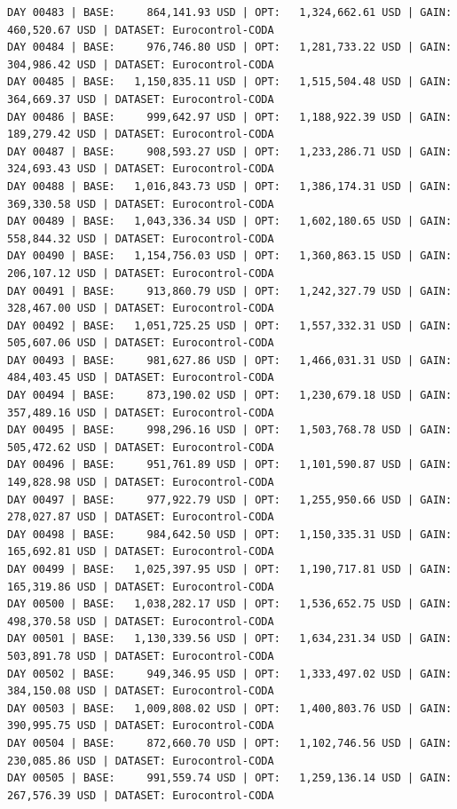 \documentclass[11pt,a4paper]{article}
\begin{document}
\begin{verbatim}
DAY 00483 | BASE:     864,141.93 USD | OPT:   1,324,662.61 USD | GAIN: 460,520.67 USD | DATASET: Eurocontrol-CODA
DAY 00484 | BASE:     976,746.80 USD | OPT:   1,281,733.22 USD | GAIN: 304,986.42 USD | DATASET: Eurocontrol-CODA
DAY 00485 | BASE:   1,150,835.11 USD | OPT:   1,515,504.48 USD | GAIN: 364,669.37 USD | DATASET: Eurocontrol-CODA
DAY 00486 | BASE:     999,642.97 USD | OPT:   1,188,922.39 USD | GAIN: 189,279.42 USD | DATASET: Eurocontrol-CODA
DAY 00487 | BASE:     908,593.27 USD | OPT:   1,233,286.71 USD | GAIN: 324,693.43 USD | DATASET: Eurocontrol-CODA
DAY 00488 | BASE:   1,016,843.73 USD | OPT:   1,386,174.31 USD | GAIN: 369,330.58 USD | DATASET: Eurocontrol-CODA
DAY 00489 | BASE:   1,043,336.34 USD | OPT:   1,602,180.65 USD | GAIN: 558,844.32 USD | DATASET: Eurocontrol-CODA
DAY 00490 | BASE:   1,154,756.03 USD | OPT:   1,360,863.15 USD | GAIN: 206,107.12 USD | DATASET: Eurocontrol-CODA
DAY 00491 | BASE:     913,860.79 USD | OPT:   1,242,327.79 USD | GAIN: 328,467.00 USD | DATASET: Eurocontrol-CODA
DAY 00492 | BASE:   1,051,725.25 USD | OPT:   1,557,332.31 USD | GAIN: 505,607.06 USD | DATASET: Eurocontrol-CODA
DAY 00493 | BASE:     981,627.86 USD | OPT:   1,466,031.31 USD | GAIN: 484,403.45 USD | DATASET: Eurocontrol-CODA
DAY 00494 | BASE:     873,190.02 USD | OPT:   1,230,679.18 USD | GAIN: 357,489.16 USD | DATASET: Eurocontrol-CODA
DAY 00495 | BASE:     998,296.16 USD | OPT:   1,503,768.78 USD | GAIN: 505,472.62 USD | DATASET: Eurocontrol-CODA
DAY 00496 | BASE:     951,761.89 USD | OPT:   1,101,590.87 USD | GAIN: 149,828.98 USD | DATASET: Eurocontrol-CODA
DAY 00497 | BASE:     977,922.79 USD | OPT:   1,255,950.66 USD | GAIN: 278,027.87 USD | DATASET: Eurocontrol-CODA
DAY 00498 | BASE:     984,642.50 USD | OPT:   1,150,335.31 USD | GAIN: 165,692.81 USD | DATASET: Eurocontrol-CODA
DAY 00499 | BASE:   1,025,397.95 USD | OPT:   1,190,717.81 USD | GAIN: 165,319.86 USD | DATASET: Eurocontrol-CODA
DAY 00500 | BASE:   1,038,282.17 USD | OPT:   1,536,652.75 USD | GAIN: 498,370.58 USD | DATASET: Eurocontrol-CODA
DAY 00501 | BASE:   1,130,339.56 USD | OPT:   1,634,231.34 USD | GAIN: 503,891.78 USD | DATASET: Eurocontrol-CODA
DAY 00502 | BASE:     949,346.95 USD | OPT:   1,333,497.02 USD | GAIN: 384,150.08 USD | DATASET: Eurocontrol-CODA
DAY 00503 | BASE:   1,009,808.02 USD | OPT:   1,400,803.76 USD | GAIN: 390,995.75 USD | DATASET: Eurocontrol-CODA
DAY 00504 | BASE:     872,660.70 USD | OPT:   1,102,746.56 USD | GAIN: 230,085.86 USD | DATASET: Eurocontrol-CODA
DAY 00505 | BASE:     991,559.74 USD | OPT:   1,259,136.14 USD | GAIN: 267,576.39 USD | DATASET: Eurocontrol-CODA

\end{verbatim}
\end{document}
